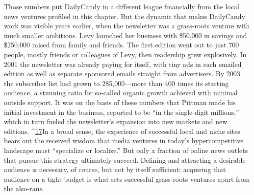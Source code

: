 Those numbers put DailyCandy in a different league financially from the local
news ventures profiled in this chapter. But the dynamic that makes DailyCandy
work was visible years earlier, when the newsletter was a grass-roots venture with
much smaller ambitions. Levy launched her business with \$50,000 in savings and
\$250,000 raised from family and friends. The first edition went out to just 700
people, mostly friends or colleagues of Levy, then readership grew explosively. In
2001 the newsletter was already paying for itself, with tiny ads in each emailed
edition as well as separate sponsored emails straight from advertisers.
By 2003 the subscriber list had grown to 285,000—more than 400 times its
starting audience, a stunning ratio for so-called organic growth achieved with
minimal outside support. It was on the basis of these numbers that Pittman
made his initial investment in the business, reported to be ``in the single-digit
millions,'' which in turn fueled the newsletter’s expansion into new markets
and new editions. ^{\href{#endnotes-ch3}{17}}In a broad sense, the experience of successful local and niche sites bears out
the received wisdom that media ventures in today’s hypercompetitive landscape
must ``specialize or localize.'' But only a fraction of online news outlets that pursue
this strategy ultimately succeed. Defining and attracting a desirable audience
is necessary, of course, but not by itself sufficient; acquiring that audience on a
tight budget is what sets successful grass-roots ventures apart from the also-rans.


